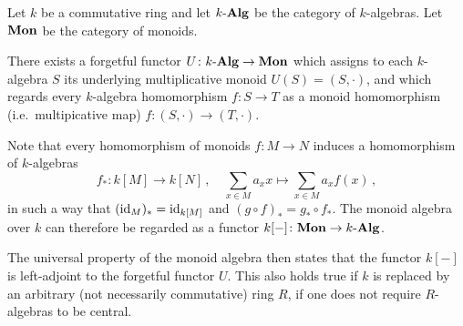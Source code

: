 \begin{remark}
  Let $k$ be a commutative ring and let $k\text{-}\mathbf{Alg}$ be the category of $k$-algebras.
  Let $\mathbf{Mon}$ be the category of monoids.
  
  There exists a forgetful functor $U \colon k\text{-}\mathbf{Alg} \to \mathbf{Mon}$ which assigns to each $k$-algebra $S$ its underlying multiplicative monoid $U(S) = (S, \cdot)$, and which regards every $k$-algebra homomorphism $f \colon S \to T$ as a monoid homomorphism (i.e.\ multipicative map) $f \colon (S, \cdot) \to (T, \cdot)$.
  
  Note that every homomorphism of monoids $f \colon M \to N$ induces a homomorphism of $k$-algebras
  \[
            f_*
    \colon  k[M]
    \to     k[N] \,,
    \quad   \sum_{x \in M} a_x x
    \mapsto \sum_{x \in M} a_x f(x) \,,
  \]
  in such a way that $(\operatorname{id}_M)_* = \operatorname{id}_{k[M]}$ and $(g \circ f)_* = g_* \circ f_*$.
  The monoid algebra over $k$ can therefore be regarded as a functor $k[-] \colon \mathbf{Mon} \to k\text{-}\mathbf{Alg}$.
  
  The universal property of the monoid algebra then states that the functor $k[-]$ is left-adjoint to the forgetful functor $U$.
  This also holds true if $k$ is replaced by an arbitrary (not necessarily commutative) ring $R$, if one does not require $R$-algebras to be central.
\end{remark}



